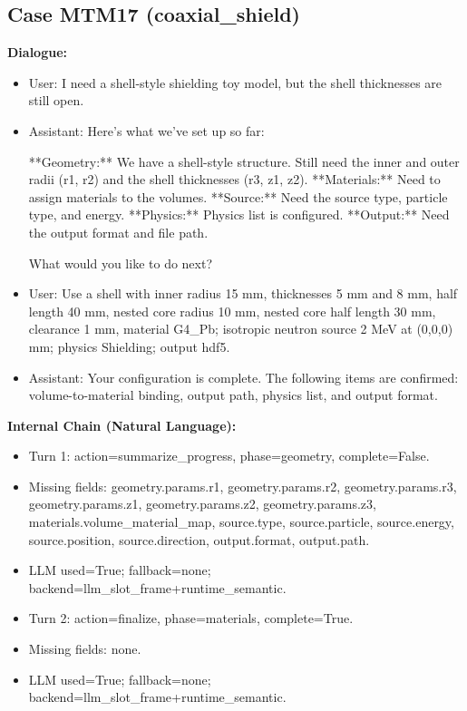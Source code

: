 \documentclass[11pt]{ctexart}
\begin{document}
\subsection{Case MTM17 (coaxial\_shield)}
\textbf{Dialogue:}
\begin{itemize}
\item User: I need a shell-style shielding toy model, but the shell thicknesses are still open.
\item Assistant: Here's what we've set up so far:

**Geometry:** We have a shell-style structure. Still need the inner and outer radii (r1, r2) and the shell thicknesses (r3, z1, z2).
**Materials:** Need to assign materials to the volumes.
**Source:** Need the source type, particle type, and energy.
**Physics:** Physics list is configured.
**Output:** Need the output format and file path.

What would you like to do next?
\item User: Use a shell with inner radius 15 mm, thicknesses 5 mm and 8 mm, half length 40 mm, nested core radius 10 mm, nested core half length 30 mm, clearance 1 mm, material G4\_Pb; isotropic neutron source 2 MeV at (0,0,0) mm; physics Shielding; output hdf5.
\item Assistant: Your configuration is complete. The following items are confirmed: volume-to-material binding, output path, physics list, and output format.
\end{itemize}
\textbf{Internal Chain (Natural Language):}
\begin{itemize}
\item Turn 1: action=summarize\_progress, phase=geometry, complete=False.
\item Missing fields: geometry.params.r1, geometry.params.r2, geometry.params.r3, geometry.params.z1, geometry.params.z2, geometry.params.z3, materials.volume\_material\_map, source.type, source.particle, source.energy, source.position, source.direction, output.format, output.path.
\item LLM used=True; fallback=none; backend=llm\_slot\_frame+runtime\_semantic.
\item Turn 2: action=finalize, phase=materials, complete=True.
\item Missing fields: none.
\item LLM used=True; fallback=none; backend=llm\_slot\_frame+runtime\_semantic.
\end{itemize}
\end{document}
